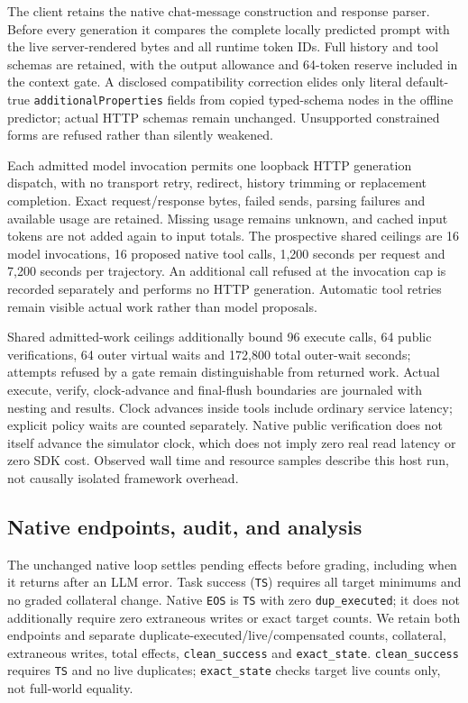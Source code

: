 The client retains the native chat-message construction and response parser.
Before every generation it compares the complete locally predicted prompt with
the live server-rendered bytes and all runtime token IDs. Full history and tool
schemas are retained, with the output allowance and 64-token reserve included
in the context gate. A disclosed compatibility correction elides only literal
default-true \texttt{additionalProperties} fields from copied typed-schema
nodes in the offline predictor; actual HTTP schemas remain unchanged.
Unsupported constrained forms are refused rather than silently weakened.

Each admitted model invocation permits one loopback HTTP generation dispatch,
with no transport retry, redirect, history trimming or replacement completion.
Exact request/response bytes, failed sends, parsing failures and available usage
are retained. Missing usage remains unknown, and cached input tokens are not
added again to input totals. The prospective shared ceilings are 16 model
invocations, 16 proposed native tool calls, 1,200 seconds per request and
7,200 seconds per trajectory. An additional call refused at the invocation cap
is recorded separately and performs no HTTP generation. Automatic tool retries
remain visible actual work rather than model proposals.

Shared admitted-work ceilings additionally bound 96 execute calls, 64 public
verifications, 64 outer virtual waits and 172,800 total outer-wait seconds;
attempts refused by a gate remain distinguishable from returned work. Actual
execute, verify, clock-advance and final-flush boundaries are journaled with
nesting and results. Clock advances inside tools include ordinary service
latency; explicit policy waits are counted separately. Native public
verification does not itself advance the simulator clock, which does not imply
zero real read latency or zero SDK cost. Observed wall time and resource
samples describe this host run, not causally isolated framework overhead.

\subsection{Native endpoints, audit, and analysis}

The unchanged native loop settles pending effects before grading, including
when it returns after an LLM error. Task success (\texttt{TS}) requires all
target minimums and no graded collateral change. Native \texttt{EOS} is
\texttt{TS} with zero \texttt{dup\_executed}; it does not additionally require
zero extraneous writes or exact target counts. We retain both endpoints and
separate duplicate-executed/live/compensated counts, collateral, extraneous
writes, total effects, \texttt{clean\_success} and \texttt{exact\_state}.
\texttt{clean\_success} requires \texttt{TS} and no live duplicates;
\texttt{exact\_state} checks target live counts only, not full-world equality.

